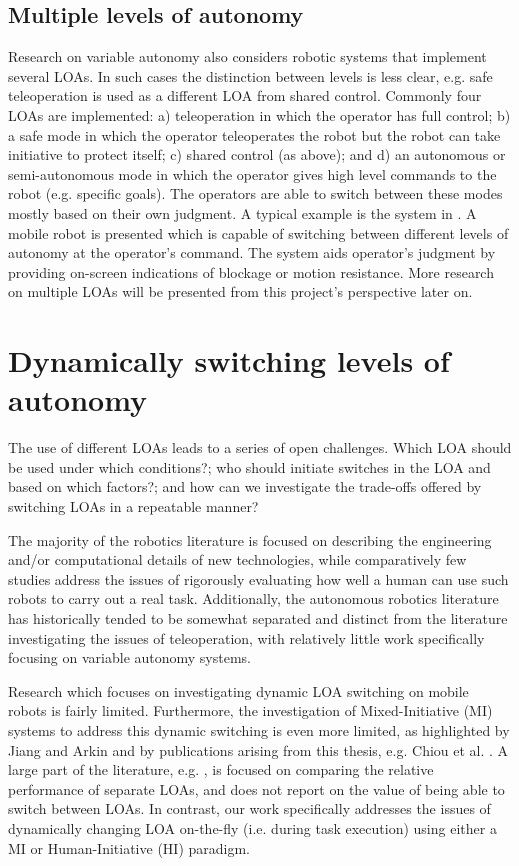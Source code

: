 \documentclass[a4paper,12pt,oneside,openright]{bhamthesis}
\begin{document}
\subsection{Multiple levels of autonomy}
Research on variable autonomy also considers robotic systems that implement several LOAs. In such cases the distinction between levels is less clear, e.g. safe teleoperation is used as a different LOA from shared control. Commonly four LOAs are implemented: a) teleoperation in which the operator has full control; b) a safe  mode in which the operator teleoperates the robot but the robot can take initiative to protect itself; c) shared control (as above); and d) an autonomous or semi-autonomous mode in which the operator gives high level commands to the robot (e.g. specific goals). The operators are able to switch between these modes mostly based on their own judgment. A typical example is the system in \cite{Bruemmer2002}. A mobile robot is presented which is capable of switching between different levels of autonomy at the operator's command. The system aids operator's judgment by providing on-screen indications of blockage or motion resistance. More research on multiple LOAs will be presented from this project's perspective later on.


\section{Dynamically switching levels of autonomy}
The use of different LOAs leads to a series of open challenges. Which LOA should be used under which conditions?; who should initiate switches in the LOA and based on which factors?; and how can we investigate the trade-offs offered by switching LOAs in a repeatable manner?

The majority of the robotics literature is focused on describing the engineering and/or computational details of new technologies, while comparatively few studies address the issues of rigorously evaluating how well a human can use such robots to carry out a real task. Additionally, the autonomous robotics literature has historically tended to be somewhat separated and distinct from the literature investigating the issues of teleoperation, with relatively little work specifically focusing on variable autonomy systems.

Research which focuses on investigating dynamic LOA switching on mobile robots is fairly limited. Furthermore, the investigation of Mixed-Initiative (MI) systems to address this dynamic switching is even more limited, as highlighted by Jiang and Arkin \cite{Jiang2015} and by publications arising from this thesis, e.g. Chiou et al. \cite{Chiou2015}. A large part of the literature, e.g. \cite{Krotkov1996, Bruemmer2005}, is focused on comparing the relative performance of separate LOAs, and does not report on the value of being able to switch between LOAs. In contrast, our work specifically addresses the issues of dynamically changing LOA on-the-fly (i.e. during task execution) using either a MI or Human-Initiative (HI) paradigm. 
\end{document}
